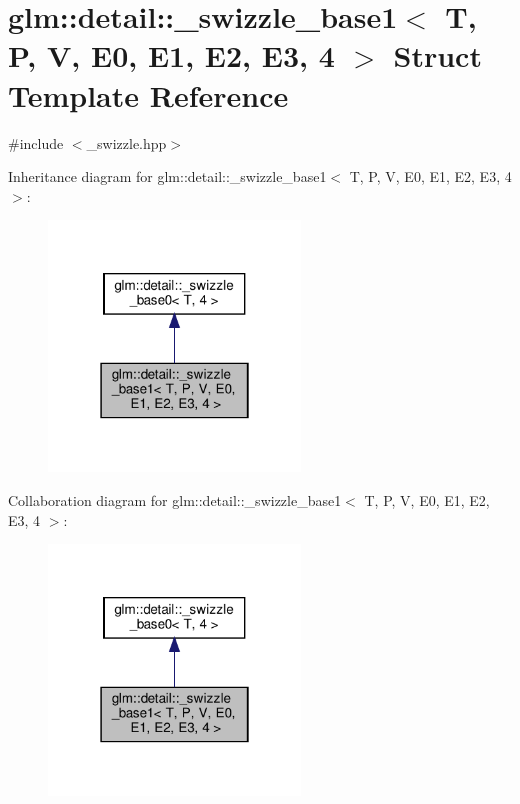 \hypertarget{structglm_1_1detail_1_1__swizzle__base1_3_01_t_00_01_p_00_01_v_00_01_e0_00_01_e1_00_01_e2_00_01_e3_00_014_01_4}{}\section{glm\+:\+:detail\+:\+:\+\_\+swizzle\+\_\+base1$<$ T, P, V, E0, E1, E2, E3, 4 $>$ Struct Template Reference}
\label{structglm_1_1detail_1_1__swizzle__base1_3_01_t_00_01_p_00_01_v_00_01_e0_00_01_e1_00_01_e2_00_01_e3_00_014_01_4}


{\ttfamily \#include $<$\+\_\+swizzle.\+hpp$>$}



Inheritance diagram for glm\+:\+:detail\+:\+:\+\_\+swizzle\+\_\+base1$<$ T, P, V, E0, E1, E2, E3, 4 $>$\+:\nopagebreak
\begin{figure}[H]
\begin{center}
\leavevmode
\includegraphics[width=190pt]{structglm_1_1detail_1_1__swizzle__base1_3_01_t_00_01_p_00_01_v_00_01_e0_00_01_e1_00_01_e2_00_01_e3_00_014_01_4__inherit__graph}
\end{center}
\end{figure}


Collaboration diagram for glm\+:\+:detail\+:\+:\+\_\+swizzle\+\_\+base1$<$ T, P, V, E0, E1, E2, E3, 4 $>$\+:\nopagebreak
\begin{figure}[H]
\begin{center}
\leavevmode
\includegraphics[width=190pt]{structglm_1_1detail_1_1__swizzle__base1_3_01_t_00_01_p_00_01_v_00_01_e0_00_01_e1_00_01_e2_00_01_e3_00_014_01_4__coll__graph}
\end{center}
\end{figure}
